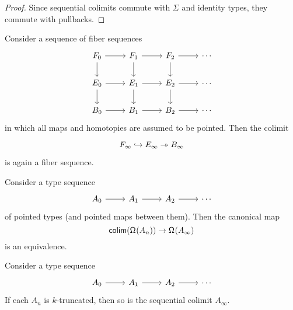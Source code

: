 \begin{proof}
Since sequential colimits commute with $\Sigma$ and identity types, they commute with pullbacks.
\end{proof}

\begin{cor}\label{thm:colim_fiberseq}
Consider a sequence of fiber sequences
\begin{equation*}
\begin{tikzcd}
F_0 \arrow[d] \arrow[r] & F_1 \arrow[d] \arrow[r] & F_2 \arrow[d] \arrow[r] & \cdots \\
E_0 \arrow[d] \arrow[r] & E_1 \arrow[d] \arrow[r] & E_2 \arrow[d] \arrow[r] & \cdots \\
B_0 \arrow[r] & B_1 \arrow[r] & B_2 \arrow[r] & \cdots
\end{tikzcd}
\end{equation*}
in which all maps and homotopies are assumed to be pointed. Then the colimit
\begin{equation*}
\begin{tikzcd}
F_\infty \hookrightarrow E_\infty \twoheadrightarrow B_\infty
\end{tikzcd}
\end{equation*}
is again a fiber sequence.
\end{cor}

\begin{cor}
Consider a type sequence
\begin{equation*}
\begin{tikzcd}
A_0 \arrow[r] & A_1 \arrow[r] & A_2 \arrow[r] & \cdots
\end{tikzcd}
\end{equation*}
of pointed types (and pointed maps between them). Then the canonical map
\begin{equation*}
\mathsf{colim}(\mathsf{\Omega}^{}(A_{n})) \to \mathsf{\Omega}^{}(A_{\infty})
\end{equation*}
is an equivalence.
\end{cor}

\begin{prp}\label{thm:colim_hlevel}
Consider a type sequence
\begin{equation*}
\begin{tikzcd}
A_0 \arrow[r] & A_1 \arrow[r] & A_2 \arrow[r] & \cdots
\end{tikzcd}
\end{equation*}
If each $A_n$ is $k$-truncated, then so is the sequential colimit $A_\infty$.
\end{prp}

